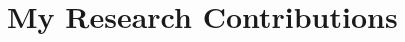 \documentclass[11pt,letterpaper]{article}
\begin{document}


\section{My Research Contributions}
\end{document}
